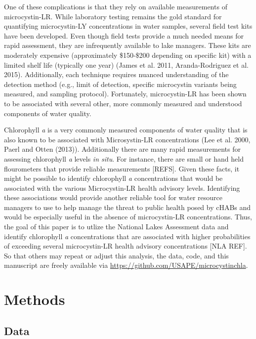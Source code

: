 \documentclass[11pt,]{article}
\begin{document}
One of these complications is that they rely on available measurements
of microcystin-LR. While laboratory testing remains the gold standard
for quantifying microcystin-LY concentrations in water samples, several
field test kits have been developed. Even though field tests provide a
much needed means for rapid assessment, they are infrequently available
to lake managers. These kits are moderately expensive (approximately
\$150-\$200 depending on specific kit) with a limited shelf life
(typically one year) (James et al. 2011, Aranda-Rodriguez et al. 2015).
Additionally, each technique requires nuanced understanding of the
detection method (e.g., limit of detection, specific microcystin
variants being measured, and sampling protocol). Fortunately,
microcystin-LR has been shown to be associated with several other, more
commonly measured and understood components of water quality.

Chlorophyll \emph{a} is a very commonly measured components of water
quality that is also known to be associated with Microsystin-LR
concentrations (Lee et al. 2000, Paerl and Otten (2013)). Additionally
there are many rapid measurements for assessing chlorophyll \emph{a}
levels \emph{in situ}. For instance, there are small or hand held
flourometers that provide reliable measurements {[}REFS{]}. Given these
facts, it might be possible to identify chlorophyll \emph{a}
concentrations that would be associated with the various Microcystin-LR
health advisory levels. Identifying these associations would provide
another reliable tool for water resource managers to use to help manage
the threat to public health posed by cHABs and would be especially
useful in the absence of microcystin-LR concentrations. Thus, the goal
of this paper is to utlize the National Lakes Assessment data and
identify chlorophyll \emph{a} concentrations that are associated with
higher probabilities of exceeding several microcystin-LR health advisory
concentrations {[}NLA REF{]}. So that others may repeat or adjust this
analysis, the data, code, and this manuscript are freely available via
\href{https://github.com/USAPE/microcystinchla}{\url{https://github.com/USAPE/microcystinchla}}.

\section{Methods}\label{methods}

\subsection{Data}\label{data}
\end{document}
